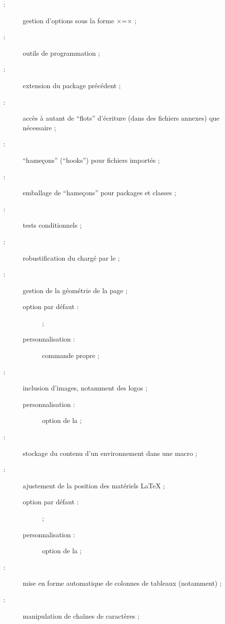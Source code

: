 \begin{description}
\item[ :] gestion d'options sous la forme
  ×=× ;
\item[ :] outils de programmation ;
\item[ :] extension du package précédent ;
\item[ :] accès à autant de \enquote{flots} d'écriture
  (dans des fichiers annexes) que nécessaire ;
\item[ :] \enquote{hameçons} (\foreignquote{english}{hooks})
  pour fichiers importés ;
\item[ :] emballage de \enquote{hameçons} pour packages et
  classes ;
\item[ :] tests conditionnels ;
\item[ :] robustification du  chargé par le
   ;
\item[ :] gestion de la géométrie de la page ;
  \begin{description}
  \item[option par défaut :]  ;
  \item[personnalisation :] commande propre  ;
  \end{description}
\item[ :] inclusion d'images, notamment des logos ;
  \begin{description}
  \item[personnalisation :] option  de la \yatcl ;
  \end{description}
\item[ :] stockage du contenu d'un environnement dans une
  macro ;
\item[ :] ajustement de la position des matériels
  \LaTeX{} ;
  \begin{description}
  \item[option par défaut :]  ;
  \item[personnalisation :] option  de la \yatcl ;
  \end{description}
\item[ :] mise en forme automatique de colonnes de tableaux
  (notamment) ;
\item[ :] manipulation de chaînes de caractères ;

\end{description}
